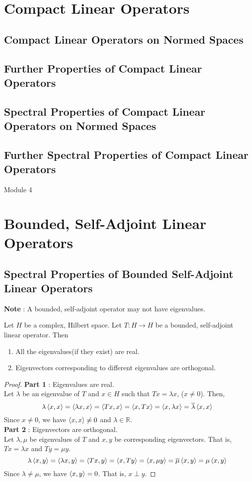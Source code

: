 \section{Compact Linear Operators}
\subsection{Compact Linear Operators on Normed Spaces}
\subsection{Further Properties of Compact Linear Operators}
\subsection{Spectral Properties of Compact Linear Operators on Normed Spaces}
\subsection{Further Spectral Properties of Compact Linear Operators}
\pagebreak

{\Large Module 4}
\section{Bounded, Self-Adjoint Linear Operators}
\subsection{Spectral Properties of Bounded Self-Adjoint Linear Operators}
\textbf{Note} : A bounded, self-adjoint operator may not have eigenvalues.
\begin{theorem}
	Let $H$ be a complex, Hilbert space.
	Let $T : H \to H$ be a bounded, self-adjoint linear operator.
	Then
	\begin{enumerate}
		\item All the eigenvalues(if they exist) are real.
		\item Eigenvectors corresponding to different eigenvalues are orthogonal.
	\end{enumerate}
\end{theorem}
\begin{proof}
	\textbf{Part 1} : Eigenvalues are real.\\
	Let $\lambda$ be an eigenvalue of $T$ and $x \in H$ such that $Tx = \lambda x$, ($x \ne 0$).
	Then,
	\[ \lambda\left\langle x,x \right\rangle = \left\langle \lambda x,x \right\rangle = \left\langle Tx,x \right\rangle = \left\langle x,Tx \right\rangle = \left\langle x,\lambda x \right\rangle = \overline{\lambda}\left\langle x,x \right\rangle \]
	Since $x \ne 0$, we have $\left\langle x,x \right\rangle \ne 0$ and $\lambda \in \mathbb{R}$.\\

	\textbf{Part 2} : Eigenvectors are orthogonal.\\
	Let $\lambda,\mu$ be eigenvalues of $T$ and $x,y$ be corresponding eigenvectors.
	That is, $Tx = \lambda x$ and $Ty = \mu y$.
	\[ \lambda \left\langle x,y \right\rangle = \left\langle \lambda x,y \right\rangle = \left\langle Tx,y \right\rangle = \left\langle x,Ty \right\rangle = \left\langle x,\mu y \right\rangle = \overline{\mu} \left\langle x,y \right\rangle = \mu \left\langle x,y \right\rangle \]
	Since $\lambda \ne \mu$, we have $\left\langle x,y \right\rangle = 0$.
	That is, $x \perp y$.
\end{proof}


